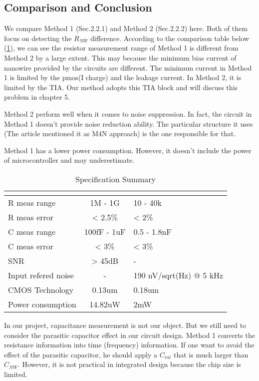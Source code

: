 \subsection{Comparison and Conclusion}
We compare Method 1 (Sec.2.2.1) and Method 2 (Sec.2.2.2) here.
Both of them focus on detecting the $R_{NW}$ difference.
According to the comparison table below (\ref{tb:LVtable}), we can see the resistor measurement range of Method 1 is different from Method 2 by a large extent.
This may because the minimum bias current of nanowire provided by the circuits are different.
The minimum current in Method 1 is limited by the pmos(I charge) and the leakage current.
In Method 2, it is limited by the TIA.
Our method adopts this TIA block and will discuss this problem in chapter 5.

Method 2 perform well when it comes to noise suppression.
In fact, the circuit in Method 1 doesn't provide noise reduction ability.
The particular structure it uses (The article \cite{Juv1} mentioned it as M4N approach) is the one responsible for that.

Method 1 has a lower power consumption. However, it doesn't include the power of microcontroller and may underestimate.

\begin{table}[!htb]
    {\fontfamily{}\fontsize{10}{14}\selectfont
    \centering
    \begin{tabular}{l|cp{4cm}}
        & \cite{Juv2} & \cite{Jlockin}\\
        \hline
        R meas range & 1M - 1G & 10 - 40k\\
        \hline
        R meas error & < 2.5\% & < 2\%\\
        \hline
        C meas range & 100fF - 1uF & 0.5 - 1.8nF\\
        \hline
        C meas error & < 3\% & < 3\%\\
        \hline
        SNR & > 45dB & - \\
        \hline
        Input refered noise & - & 190 nV/sqrt(Hz) @ 5 kHz \\
        \hline
        CMOS Technology & 0.13um & 0.18um\\
        \hline
        Power consumption & 14.82uW & 2mW\\
    \end{tabular}
    \caption{Specification Summary}
    \label{tb:LVtable}
    }
\end{table}

In our project, capacitance measurement is not our object.
But we still need to consider the parasitic capacitor effect in our circuit design.
Method 1 converts the resistance information into time (frequency) information.
If one want to avoid the effect of the parasitic capacitor, he should apply a $C_{int}$ that is much larger than $C_{NW}$.
However, it is not practical in integrated design because the chip size is limited.

